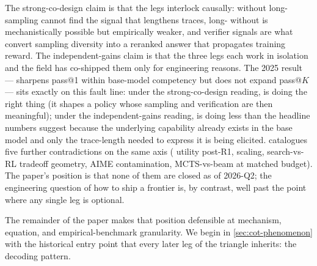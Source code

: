 The strong-co-design claim is that the legs interlock causally: 
without long- sampling cannot find the signal that lengthens
traces, long- without  is mechanistically possible but
empirically weaker, and verifier signals are what convert sampling
diversity into a reranked answer that propagates training reward.
The independent-gains claim is that the three legs each work in
isolation and the field has co-shipped them only for engineering
reasons. The 2025 \citet{rlvr-limits-2025} result ---  sharpens
pass@1 within base-model competency but does not expand pass@$K$ ---
sits exactly on this fault line: under the strong-co-design reading,
 is doing the right thing (it shapes a policy whose sampling and
verification are then meaningful); under the independent-gains
reading,  is doing less than the headline numbers suggest because
the underlying capability already exists in the base model and only
the trace-length needed to express it is being elicited.
 catalogues five further contradictions on
the same axis ( utility post-R1,  scaling,
search-vs-RL tradeoff geometry, AIME contamination, MCTS-vs-beam at
matched budget). The paper's position is that none of them are closed
as of 2026-Q2; the engineering question of how to ship a frontier
 is, by contrast, well past the point where any single
leg is optional.

The remainder of the paper makes that position defensible at
mechanism, equation, and empirical-benchmark granularity. We begin in
\cref{sec:cot-phenomenon} with the historical entry point that every
later leg of the triangle inherits: the  decoding
pattern.
